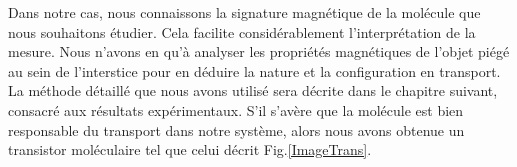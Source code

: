 Dans notre cas, nous connaissons la signature magnétique de la molécule que nous souhaitons étudier. Cela facilite considérablement l'interprétation de la mesure. Nous n'avons en qu'à analyser les propriétés magnétiques de l'objet piégé au sein de l'interstice pour en déduire la nature et la configuration en transport. La méthode détaillé que nous avons utilisé sera décrite dans le chapitre suivant, consacré aux résultats expérimentaux.  S'il s'avère que la molécule est bien responsable du transport dans notre système, alors nous avons obtenue un transistor moléculaire tel que celui décrit Fig.\ref{ImageTrans}.


